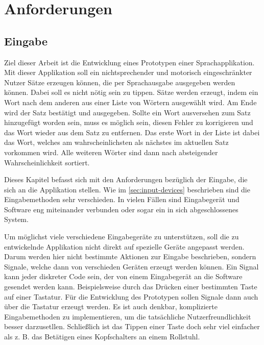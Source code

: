 \section{Anforderungen}
    
	\subsection{Eingabe}
 
    	Ziel dieser Arbeit ist die Entwicklung eines Prototypen einer Sprachapplikation. Mit dieser Applikation soll ein nichtsprechender und motorisch eingeschränkter Nutzer Sätze erzeugen können, die per Sprachausgabe ausgegeben werden können. Dabei soll es nicht nötig sein zu tippen. Sätze werden erzeugt, indem ein Wort nach dem anderen aus einer Liste von Wörtern ausgewählt wird. Am Ende wird der Satz bestätigt und ausgegeben. Sollte ein Wort ausversehen zum Satz hinzugefügt worden sein, muss es möglich sein, diesen Fehler zu korrigieren und das Wort wieder aus dem Satz zu entfernen. Das erste Wort in der Liste ist dabei das Wort, welches am wahrscheinlichsten als nächstes im aktuellen Satz vorkommen wird. Alle weiteren Wörter sind dann nach absteigender Wahrscheinlichkeit sortiert.
         
    	Dieses Kapitel befasst sich mit den Anforderungen bezüglich der Eingabe, die sich an die Applikation stellen. Wie im \autoref {sec:input-devices} beschrieben sind die Eingabemethoden sehr verschieden. In vielen Fällen sind Eingabegerät und Software eng miteinander verbunden oder sogar ein in sich abgeschlossenes System.
        
        Um möglichst viele verschiedene Eingabegeräte zu unterstützen, soll die zu entwickelnde Applikation nicht direkt auf spezielle Geräte angepasst werden. Darum werden hier nicht bestimmte Aktionen zur Eingabe beschrieben, sondern Signale, welche dann von verschieden Geräten erzeugt werden können. Ein Signal kann jeder diskreter Code sein, der von einem Eingabegerät an die Software gesendet werden kann. Beispielsweise durch das Drücken einer bestimmten Taste auf einer Tastatur. Für die Entwicklung des Prototypen sollen Signale dann auch über die Tastatur erzeugt werden. Es ist auch denkbar, komplizierte Eingabemethoden zu implementieren, um die tatsächliche Nutzerfreundlichkeit besser darzusetllen. Schließlich ist das Tippen einer Taste doch sehr viel einfacher als z. B. das Betätigen eines Kopfschalters an einem Rollstuhl. 
        
